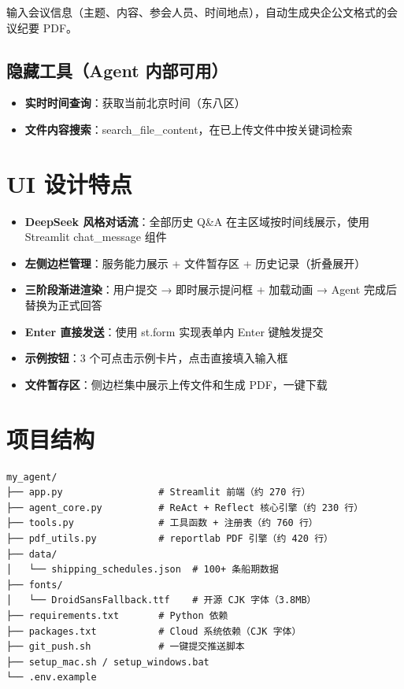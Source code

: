 \documentclass[12pt,a4paper]{ctexart}
\begin{document}
\begin{featurebox}[会议纪要生成]
输入会议信息（主题、内容、参会人员、时间地点），自动生成央企公文格式的会议纪要 PDF。
\end{featurebox}

\subsection{隐藏工具（Agent 内部可用）}

\begin{itemize}[leftmargin=*]
    \item \textbf{实时时间查询}：获取当前北京时间（东八区）
    \item \textbf{文件内容搜索}：search\_file\_content，在已上传文件中按关键词检索
\end{itemize}

\section{UI 设计特点}

\begin{itemize}[leftmargin=*]
    \item \textbf{DeepSeek 风格对话流}：全部历史 Q\&A 在主区域按时间线展示，使用 Streamlit chat\_message 组件
    \item \textbf{左侧边栏管理}：服务能力展示 + 文件暂存区 + 历史记录（折叠展开）
    \item \textbf{三阶段渐进渲染}：用户提交 → 即时展示提问框 + 加载动画 → Agent 完成后替换为正式回答
    \item \textbf{Enter 直接发送}：使用 st.form 实现表单内 Enter 键触发提交
    \item \textbf{示例按钮}：3 个可点击示例卡片，点击直接填入输入框
    \item \textbf{文件暂存区}：侧边栏集中展示上传文件和生成 PDF，一键下载
\end{itemize}

\section{项目结构}

\begin{verbatim}
my_agent/
├── app.py                 # Streamlit 前端（约 270 行）
├── agent_core.py          # ReAct + Reflect 核心引擎（约 230 行）
├── tools.py               # 工具函数 + 注册表（约 760 行）
├── pdf_utils.py           # reportlab PDF 引擎（约 420 行）
├── data/
│   └── shipping_schedules.json  # 100+ 条船期数据
├── fonts/
│   └── DroidSansFallback.ttf    # 开源 CJK 字体（3.8MB）
├── requirements.txt       # Python 依赖
├── packages.txt           # Cloud 系统依赖（CJK 字体）
├── git_push.sh            # 一键提交推送脚本
├── setup_mac.sh / setup_windows.bat
└── .env.example
\end{verbatim}
\end{document}
